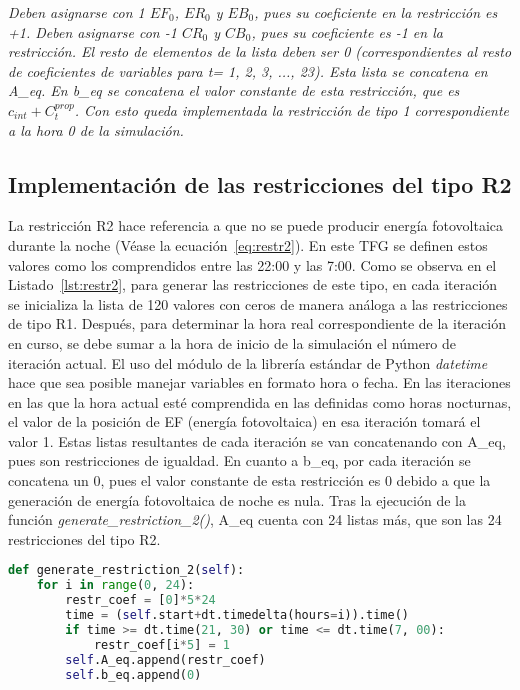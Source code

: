 \textit{Deben asignarse con 1 $ EF_{0} $, $ ER_{0} $ y $ EB_{0} $, pues su coeficiente en la restricción es +1. Deben asignarse con -1 $ CR_{0} $ y $ CB_{0} $, pues su coeficiente es -1 en la restricción. El resto de elementos de la lista deben ser 0 (correspondientes al resto de coeficientes de variables para t= 1, 2, 3, ..., 23). Esta lista se concatena en A\_eq. En b\_eq se concatena el valor constante de esta restricción, que es $ c_{int} + C_{t}^{prop} $. Con esto queda implementada la restricción de tipo 1 correspondiente a la hora 0 de la simulación.}

\subsection{Implementación de las restricciones del tipo R2}
La restricción R2 hace referencia a que no se puede producir energía fotovoltaica durante la noche (Véase la ecuación~\ref{eq:restr2}). En este \gls{TFG} se definen estos valores como los comprendidos entre las 22:00 y las 7:00. Como se observa en el Listado~\ref{lst:restr2}, para generar las restricciones de este tipo, en cada iteración se inicializa la lista de 120 valores con ceros de manera análoga a las restricciones de tipo R1. Después, para determinar la hora real correspondiente de la iteración en curso, se debe sumar a la hora de inicio de la simulación el número de iteración actual. El uso del módulo de la librería estándar de Python \textit{datetime}~\cite{Dtpy} hace que sea posible manejar variables en formato hora o fecha. En las iteraciones en las que la hora actual esté comprendida en las definidas como horas nocturnas, el valor de la posición de EF (energía fotovoltaica) en esa iteración tomará el valor 1. Estas listas resultantes de cada iteración se van concatenando con A\_eq, pues son restricciones de igualdad. En cuanto a b\_eq, por cada iteración se concatena un 0, pues el valor constante de esta restricción es 0 debido a que la generación de energía fotovoltaica de noche es nula. Tras la ejecución de la función \textit{generate\_restriction\_2()}, A\_eq cuenta con 24 listas más, que son las 24 restricciones del tipo R2.
\begin{lstlisting}[language=Python,float=ht,caption={Restricciones del tipo R2},label={lst:restr2}]
def generate_restriction_2(self):
    for i in range(0, 24):
        restr_coef = [0]*5*24
        time = (self.start+dt.timedelta(hours=i)).time()
        if time >= dt.time(21, 30) or time <= dt.time(7, 00):
            restr_coef[i*5] = 1
        self.A_eq.append(restr_coef)
        self.b_eq.append(0)
\end{lstlisting}
